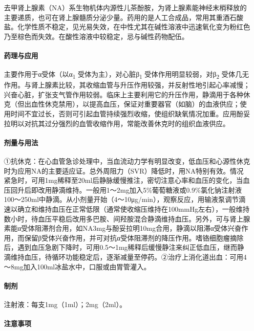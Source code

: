 去甲肾上腺素（NA）系生物机体内源性儿茶酚胺，为肾上腺素能神经末梢释放的主要递质，也可在肾上腺髓质分泌少量。药用的是人工合成品，常用其重酒石酸盐。化学性质不稳定，见光易失效，在中性尤其在碱性溶液中迅速氧化变为粉红色乃至棕色而失效。在酸性溶液中较稳定，忌与碱性药物配伍。

\paragraph{药理与应用}

主要作用于α受体（以α\textsubscript{1}
受体为主），对心脏β\textsubscript{1}
受体作用明显较弱，对β\textsubscript{2}
受体几无作用。与肾上腺素比较，其收缩血管与升压作用较强，并反射性地引起心率减慢；兴奋心脏，扩张支气管作用较弱。临床上主要利用它的升压作用，静滴用于各种休克（但出血性休克禁用），以提高血压，保证对重要器官（如脑）的血液供应；使用时间不宜过长，否则可引起血管持续强烈收缩，使组织缺氧情况加重。应用酚妥拉明以对抗其过分强烈的血管收缩作用，常能改善休克时的组织血液供应。

\paragraph{剂量与用法}

①抗休克：在心血管急诊处理中，当血流动力学有明显改变，低血压和心源性休克时为应用NA的主要适应证。总外周阻力（SVR）降低时，用NA特别有效。情况紧急时，可用1mg稀释至20ml后静脉缓慢推注，密切注意心率和血压的变化，当血压回升后即改用静滴维持。一般用1～2mg加入5\%葡萄糖液或0.9\%氯化钠注射液100～250ml中静滴。从小剂量开始（4～10μg/min），观察反应，用输液泵调节滴速以确立和维持血压在正常低限（通常使收缩压维持在100mmHg左右），一般维持数小时，待血压平稳后改用多巴胺、间羟胺混合静滴维持血压。另外，可与肾上腺素能α受体阻滞剂合用，如NA3mg与酚妥拉明10mg合用，静滴以阻滞α受体兴奋作用，而保留β受体兴奋作用，并可对抗α受体阻滞剂的降压作用。嗜铬细胞瘤摘除后，遇到血压急剧下降时，可用0.5～1mg稀释后缓慢静注来纠正低血压，继而静滴维持血压，待循环功能稳定后，逐渐减量至停药。②治疗上消化道出血：可用4～8mg加入100ml冰盐水中，口服或由胃管灌入。

\paragraph{制剂}

注射液：每支1mg（1ml）；2mg（2ml）。

\paragraph{注意事项}


